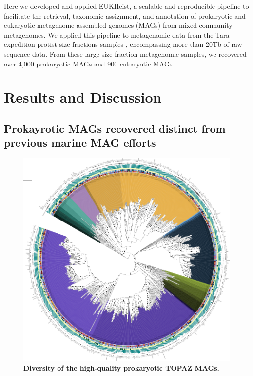 \documentclass[12pt]{article}
\numberwithin{equation}{section}
\begin{document}
Here we developed and applied EUKHeist, a scalable and reproducible pipeline to facilitate the retrieval, taxonomic assignment, and annotation of prokaryotic and eukaryotic metagenome assembled genomes (MAGs) from mixed community metagenomes. We applied this pipeline to metagenomic data from the Tara expedition protist-size fractions samples \citep{Carradec2018global}, encompassing more than 20Tb of raw sequence data. From these large-size fraction metagenomic samples, we recovered over 4,000 prokaryotic MAGs and 900 eukaryotic MAGs. 

\section*{Results and Discussion}
\subsection*{Prokayrotic MAGs recovered distinct from previous marine MAG efforts}




\begin{figure}[h!]    
    \centering
    \includegraphics[width = 0.95\columnwidth]{figures/Figure1-prok-mags.png}
    \caption{\textbf{Diversity of the high-quality prokaryotic TOPAZ MAGs.} }
    \label{fig:fig4-trophy}
\end{figure}
\end{document}
